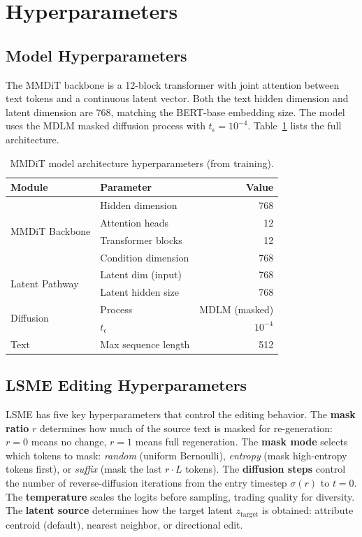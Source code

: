 \documentclass{article}
\begin{document}
\section{Hyperparameters}
\label{sec:hyperparams}

\subsection{Model Hyperparameters}

The MMDiT backbone is a 12-block transformer with joint attention between text tokens and a continuous latent vector. Both the text hidden dimension and latent dimension are 768, matching the BERT-base embedding size. The model uses the MDLM masked diffusion process with $t_\epsilon = 10^{-4}$. Table~\ref{tab:model_hparams} lists the full architecture.

\begin{table}[h]
\centering
\caption{MMDiT model architecture hyperparameters (from training).}
\label{tab:model_hparams}
\begin{tabular}{llr}
\toprule
\textbf{Module} & \textbf{Parameter} & \textbf{Value} \\
\midrule
\multirow{4}{*}{MMDiT Backbone} & Hidden dimension & 768 \\
& Attention heads & 12 \\
& Transformer blocks & 12 \\
& Condition dimension & 768 \\
\midrule
\multirow{2}{*}{Latent Pathway} & Latent dim (input) & 768 \\
& Latent hidden size & 768 \\
\midrule
\multirow{2}{*}{Diffusion} & Process & MDLM (masked) \\
& $t_\epsilon$ & $10^{-4}$ \\
\midrule
Text & Max sequence length & 512 \\
\bottomrule
\end{tabular}
\end{table}

\subsection{LSME Editing Hyperparameters}

LSME has five key hyperparameters that control the editing behavior. The \textbf{mask ratio} $r$ determines how much of the source text is masked for re-generation: $r = 0$ means no change, $r = 1$ means full regeneration. The \textbf{mask mode} selects which tokens to mask: \textit{random} (uniform Bernoulli), \textit{entropy} (mask high-entropy tokens first), or \textit{suffix} (mask the last $r \cdot L$ tokens). The \textbf{diffusion steps} control the number of reverse-diffusion iterations from the entry timestep $\sigma(r)$ to $t = 0$. The \textbf{temperature} scales the logits before sampling, trading quality for diversity. The \textbf{latent source} determines how the target latent $z_\text{target}$ is obtained: attribute centroid (default), nearest neighbor, or directional edit.
\end{document}
